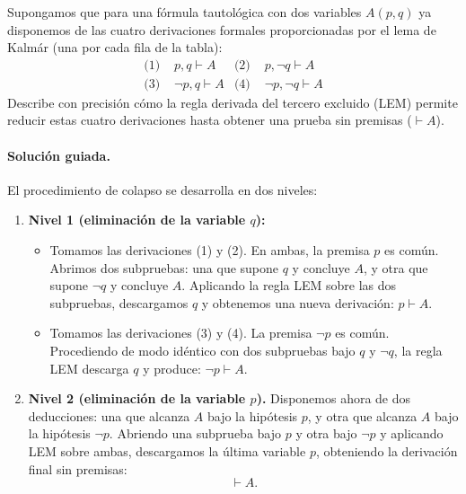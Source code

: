 \begin{pregunta}\label{e3-3}
Supongamos que para una fórmula tautológica con dos variables $A(p, q)$ ya disponemos de las cuatro derivaciones formales proporcionadas por el lema de Kalmár (una por cada fila de la tabla):
\begin{align*}
\text{(1) } & p, q \vdash A & \text{(2) } & p, \neg q \vdash A \\
\text{(3) } & \neg p, q \vdash A & \text{(4) } & \neg p, \neg q \vdash A
\end{align*}
Describe con precisión cómo la regla derivada del tercero excluido (LEM) permite reducir estas cuatro derivaciones hasta obtener una prueba sin premisas ($\vdash A$).

\paragraph{Solución guiada.}
El procedimiento de colapso se desarrolla en dos niveles:
\begin{enumerate}
    \item \textbf{Nivel 1 (eliminación de la variable $q$):}
    \begin{itemize}
        \item Tomamos las derivaciones (1) y (2). En ambas, la premisa $p$ es común. Abrimos dos subpruebas: una que supone $q$ y concluye $A$, y otra que supone $\neg q$ y concluye $A$. Aplicando la regla LEM sobre las dos subpruebas, descargamos $q$ y obtenemos una nueva derivación: $p \vdash A$.
        \item Tomamos las derivaciones (3) y (4). La premisa $\neg p$ es común. Procediendo de modo idéntico con dos subpruebas bajo $q$ y $\neg q$, la regla LEM descarga $q$ y produce: $\neg p \vdash A$.
    \end{itemize}
    \item \textbf{Nivel 2 (eliminación de la variable $p$).}
    Disponemos ahora de dos deducciones: una que alcanza $A$ bajo la hipótesis $p$, y otra que alcanza $A$ bajo la hipótesis $\neg p$. Abriendo una subprueba bajo $p$ y otra bajo $\neg p$ y aplicando LEM sobre ambas, descargamos la última variable $p$, obteniendo la derivación final sin premisas:
    \[
    \vdash A.
    \]
\end{enumerate}

\end{pregunta}

